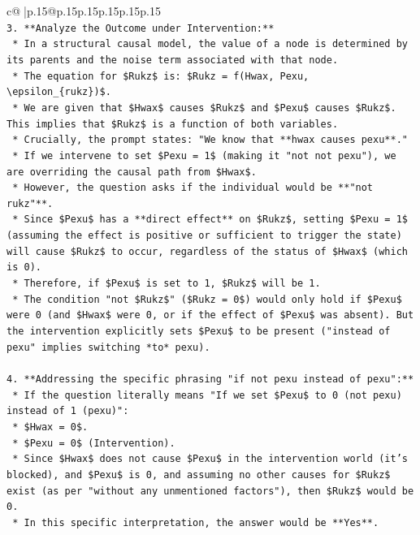 \documentclass{article}
\begin{document}
{\begin{supertabular}{c@{$\;$}|p{.15\linewidth}@{}p{.15\linewidth}p{.15\linewidth}p{.15\linewidth}p{.15\linewidth}p{.15\linewidth}}
{{{\\ 
\texttt{3.  **Analyze the Outcome under Intervention:**} \\
\texttt{    *   In a structural causal model, the value of a node is determined by its parents and the noise term associated with that node.} \\
\texttt{    *   The equation for \$Rukz\$ is: \$Rukz = f(Hwax, Pexu, \textbackslash{}epsilon\_\{rukz\})\$.} \\
\texttt{    *   We are given that \$Hwax\$ causes \$Rukz\$ and \$Pexu\$ causes \$Rukz\$. This implies that \$Rukz\$ is a function of both variables.} \\
\texttt{    *   Crucially, the prompt states: "We know that **hwax causes pexu**."} \\
\texttt{    *   If we intervene to set \$Pexu = 1\$ (making it "not not pexu"), we are overriding the causal path from \$Hwax\$.} \\
\texttt{    *   However, the question asks if the individual would be **"not rukz"**.} \\
\texttt{    *   Since \$Pexu\$ has a **direct effect** on \$Rukz\$, setting \$Pexu = 1\$ (assuming the effect is positive or sufficient to trigger the state) will cause \$Rukz\$ to occur, regardless of the status of \$Hwax\$ (which is 0).} \\
\texttt{    *   Therefore, if \$Pexu\$ is set to 1, \$Rukz\$ will be 1.} \\
\texttt{    *   The condition "not \$Rukz\$" (\$Rukz = 0\$) would only hold if \$Pexu\$ were 0 (and \$Hwax\$ were 0, or if the effect of \$Pexu\$ was absent). But the intervention explicitly sets \$Pexu\$ to be present ("instead of pexu" implies switching *to* pexu).} \\
\\ 
\texttt{4.  **Addressing the specific phrasing "if not pexu instead of pexu":**} \\
\texttt{    *   If the question literally means "If we set \$Pexu\$ to 0 (not pexu) instead of 1 (pexu)":} \\
\texttt{        *   \$Hwax = 0\$.} \\
\texttt{        *   \$Pexu = 0\$ (Intervention).} \\
\texttt{        *   Since \$Hwax\$ does not cause \$Pexu\$ in the intervention world (it's blocked), and \$Pexu\$ is 0, and assuming no other causes for \$Rukz\$ exist (as per "without any unmentioned factors"), then \$Rukz\$ would be 0.} \\
\texttt{        *   In this specific interpretation, the answer would be **Yes**.} \\
}}}
\end{supertabular}}
\end{document}
